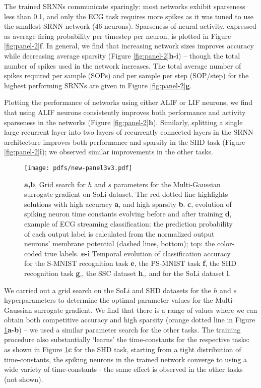 \documentclass[fleqn,10pt]{wlscirep}
\begin{document}
The trained SRNNs communicate sparingly: most networks exhibit sparseness less than 0.1, and only the ECG task requires more spikes as it was tuned to use the smallest SRNN network (46 neurons). Sparseness of neural activity, expressed as average firing probability per timestep per neuron, is plotted in Figure \ref{fig:panel-2}\textbf{f}.
In general, we find that increasing network sizes improves accuracy while decreasing average sparsity (Figure \ref{fig:panel-2}\textbf{h-i}) -- though the total number of spikes used in the network increases. The total average number of spikes required per sample (SOPs) and per sample per step (SOP/step) for the highest performing SRNNs are given in Figure \ref{fig:panel-2}\textbf{g}. 

Plotting the performance of networks using either ALIF or LIF neurons, we find that using ALIF neurons consistently improves both performance and activity sparseness in the networks (Figure \ref{fig:panel-2}\textbf{h}). Similarly, splitting a single large recurrent layer into two layers of recurrently connected layers in the SRNN architecture improves both performance and sparsity in the SHD task (Figure \ref{fig:panel-2}\textbf{i}); we observed similar improvements in the other tasks. 

\begin{figure}[ht!]
\centering
\texttt{[image: pdfs/new-panel3v3.pdf]}
\caption{\textbf{a,b}, Grid search for $h$ and $s$ parameters for the Multi-Gaussian surrogate gradient on SoLi dataset. The red dotted line highlights solutions with high accuracy \textbf{a}, and high sparsity \textbf{b}. \textbf{c}, evolution of spiking neuron time constants evolving before and after training \textbf{d}, example of ECG streaming classification: the prediction probability of each output label is calculated from the normalized output neurons' membrane potential (dashed lines, bottom); top: the color-coded true labels. \textbf{e-i} Temporal evolution of classification accuracy for the S-MNIST recognition task \textbf{e}, the PS-MNIST task \textbf{f}, the SHD recognition task \textbf{g},, the SSC dataset \textbf{h},, and for the SoLi dataset \textbf{i}. }

\label{fig:panel3}
\end{figure}


We carried out a grid search on the SoLi and SHD datasets for the $h$ and $s$ hyperparameters to determine the optimal parameter values for the Multi-Gaussian surrogate gradient. We find that there is a range of values where we can obtain both competitive accuracy and high sparsity (orange dotted line in Figure \ref{fig:panel3}\textbf{a-b}) -- we used a similar parameter search for the other tasks. The training procedure also substantially `learns' the time-constants for the respective tasks: as shown in Figure \ref{fig:panel3}\textbf{c} for the SHD task, starting from a tight distribution of time-constants, the spiking neurons in the trained network converge to using a wide variety of time-constants - the same effect is observed in the other tasks (not shown). 
\end{document}
